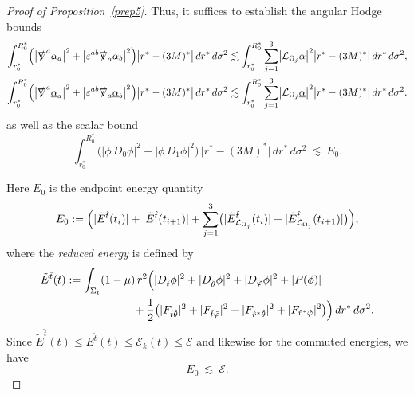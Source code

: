 \documentclass[11pt]{article}
\numberwithin{equation}{section}
\theoremstyle{plain}
\theoremstyle{definition}
\theoremstyle{remark}
\begin{document}
\begin{proof}[Proof of Proposition~\ref{prep5}]
Thus, it suffices to establish the angular Hodge bounds
\begin{eqnarray}
\int_{r_{0}^{\ast}}^{R_{0}^{\ast}}
\Bigl(\bigl|\slashed\nabla^{a}\alpha_{a}\bigr|^{2}+\bigl|\varepsilon^{ab}\slashed\nabla_{a}\alpha_{b}\bigr|^{2}\Bigr)
\bigl|r^{\ast}-(3M)^{\ast}\bigr|\,dr^{\ast}\,d\sigma^{2}
&\lesssim
\int_{r_{0}^{\ast}}^{R_{0}^{\ast}}
\sum_{j=1}^{3}\bigl|\mathcal{L}_{\Omega_j}\alpha\bigr|^{2}\bigl|r^{\ast}-(3M)^{\ast}\bigr|\,dr^{\ast}\,d\sigma^{2},\label{sukuF}\\
\int_{r_{0}^{\ast}}^{R_{0}^{\ast}}
\Bigl(\bigl|\slashed\nabla^{a}\underline{\alpha}_{a}\bigr|^{2}+\bigl|\varepsilon^{ab}\slashed\nabla_{a}\underline{\alpha}_{b}\bigr|^{2}\Bigr)
\bigl|r^{\ast}-(3M)^{\ast}\bigr|\,dr^{\ast}\,d\sigma^{2}
&\lesssim
\int_{r_{0}^{\ast}}^{R_{0}^{\ast}}
\sum_{j=1}^{3}\bigl|\mathcal{L}_{\Omega_j}\underline{\alpha}\bigr|^{2}\bigl|r^{\ast}-(3M)^{\ast}\bigr|\,dr^{\ast}\,d\sigma^{2}.\nonumber
\end{eqnarray}
as well as the scalar bound
\begin{equation}\label{sukuskalar}
\int_{r_{0}^{\ast}}^{R_{0}^{\ast}}
\bigl(|\phi\,D_{0}\phi|^{2}+|\phi\,D_{1}\phi|^{2}\bigr)\,\bigl|r^{\ast}-(3M)^{\ast}\bigr|
\,dr^{\ast}\,d\sigma^{2}
\ \lesssim\ E_{0}.
\end{equation}

Here $E_{0}$ is the endpoint energy quantity
\begin{equation}\label{E0}
E_{0}
:=
\Bigl(
|\tilde E^{\hat t}(t_{i})|+|\tilde E^{\hat t}(t_{i+1})|
+\sum_{j=1}^{3}\bigl(|\tilde E^{\hat t}_{\mathcal L_{\Omega_j}}(t_{i})|+|\tilde E^{\hat t}_{\mathcal L_{\Omega_j}}(t_{i+1})|\bigr)
\Bigr),
\end{equation}
where the \emph{reduced energy} is defined by
\begin{eqnarray}\label{energyasumtimelike}
\tilde{E}^{\hat{t}}(t)
&:=
\int_{\Sigma_{t}}
(1-\mu)\,r^{2}
\Bigl(
|D_{\hat{t}}\phi|^{2}+|D_{\hat{\theta}}\phi|^{2}+|D_{\hat{\varphi}}\phi|^{2}+|P(\phi)|
\nonumber\\
&\qquad\qquad\qquad
+\frac12\bigl(|F_{\hat{t}\hat{\theta}}|^{2}+|F_{\hat{t}\hat{\varphi}}|^{2}
+|F_{\hat r^{\ast}\hat{\theta}}|^{2}+|F_{\hat r^{\ast}\hat{\varphi}}|^{2}\bigr)
\Bigr)\,dr^{\ast}\,d\sigma^{2}.
\end{eqnarray}
Since $\tilde E^{\hat t}(t)\le E^{\hat t}(t)\le \mathcal E_k(t)\le \mathcal E$ and likewise for the commuted energies, we have
\begin{equation}\label{Ecurl}
E_{0}\ \lesssim\ \mathcal E.
\end{equation}


\end{proof}
\end{document}
